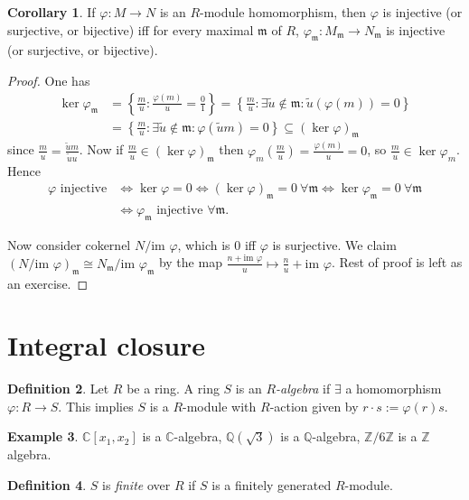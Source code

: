 \documentclass[a4paper]{article}
\newcommand{\Z}{\mathbb Z}
\newcommand{\Q}{\mathbb Q}
\newcommand{\C}{\mathbb C}
\newcommand{\m}{\mathfrak m}
\newcommand{\im}{\text{im }}
\theoremstyle{definition}
\newtheorem{defn}{Definition}[subsection]
\newtheorem{coro}[defn]{Corollary}
\newtheorem{example}[defn]{Example}
\begin{document}
\begin{coro}
If $\varphi:M\rightarrow N$ is an $R$-module homomorphism, then $\varphi$ is injective (or surjective, or bijective) iff for every maximal $\m$ of $R$, $\varphi_{\m}:M_\m \rightarrow N_\m$ is injective (or surjective, or bijective).
\end{coro}
\begin{proof}
One has
\[
\begin{aligned}
\ker\varphi_\m &= \left\{\frac{m}{u}:\frac{\varphi(m)}{u}=\frac01\right\} = \left\{\frac{m}{u}:\exists \widetilde u\notin \m:\widetilde u(\varphi(m))=0\right\} \\&= \left\{\frac{m}{u}:\exists \widetilde u\notin \m:\varphi(\widetilde um)=0\right\} \subseteq (\ker\varphi)_\m
\end{aligned}
\]
since $\displaystyle \frac{m}{u}=\frac{\widetilde um}{\widetilde uu}$. Now if $\displaystyle \frac{m}{u}\in(\ker\varphi)_\m$ then $\displaystyle \varphi_m\left(\frac{m}{u}\right)=\frac{\varphi(m)}{u}=0$, so $\displaystyle \frac{m}{u}\in\ker\varphi_m$. Hence
\[
\begin{aligned}
\varphi\text{ injective} &\Leftrightarrow \ker\varphi=0 \Leftrightarrow (\ker\varphi)_\m=0 \ \forall \m \Leftrightarrow \ker\varphi_\m=0 \ \forall \m \\&\Leftrightarrow \varphi_\m\text{ injective } \forall \m.
\end{aligned}
\]

Now consider cokernel $N/\im\varphi$, which is $0$ iff $\varphi$ is surjective. We claim $(N/\im\varphi)_\m \cong N_\m/\im\varphi_\m$ by the map $\displaystyle \frac{n+\im\varphi}{u}\mapsto\frac{n}{u}+\im\varphi$. Rest of proof is left as an exercise.
\end{proof}

\section{Integral closure}
\begin{defn}
Let $R$ be a ring. A ring $S$ is an $R$\textit{-algebra} if $\exists$ a homomorphism $\varphi:R\rightarrow S$. This implies $S$ is a $R$-module with $R$-action given by $r\cdot s:=\varphi(r)s$.
\end{defn}
\begin{example}
$\C[x_1,x_2]$ is a $\C$-algebra, $\Q\left(\sqrt 3\right)$ is a $\Q$-algebra, $\Z/6\Z$ is a $\Z$ algebra.
\end{example}

\begin{defn}
$S$ is \textit{finite} over $R$ if $S$ is a finitely generated $R$-module.
\end{defn}
\end{document}
